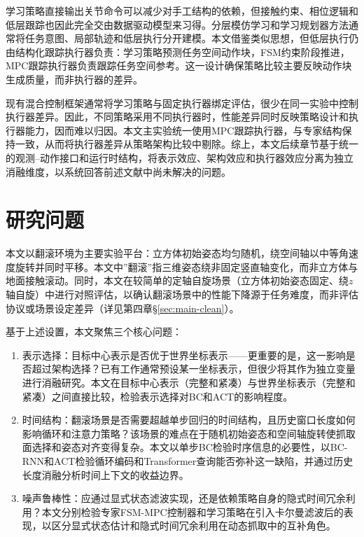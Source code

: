 学习策略直接输出关节命令可以减少对手工结构的依赖，但接触约束、相位逻辑和低层跟踪也因此完全交由数据驱动模型来习得。分层模仿学习和学习规划器方法通常将任务意图、局部轨迹和低层执行分开建模\citep{lynch2020learning,mandlekar2020iris,wang2023mimicplay}。本文借鉴类似思想，但低层执行仍由结构化跟踪执行器负责：学习策略预测任务空间动作块，FSM约束阶段推进，MPC跟踪执行器负责跟踪任务空间参考。这一设计确保策略比较主要反映动作块生成质量，而非执行器的差异。

现有混合控制框架通常将学习策略与固定执行器绑定评估，很少在同一实验中控制执行器差异。因此，不同策略采用不同执行器时，性能差异同时反映策略设计和执行器能力，因而难以归因。本文主实验统一使用MPC跟踪执行器，与专家结构保持一致，从而将执行器差异从策略架构比较中剔除。综上，本文后续章节基于统一的观测--动作接口和运行时结构，将表示效应、架构效应和执行器效应分离为独立消融维度，以系统回答前述文献中尚未解决的问题。

\section{研究问题}

本文以翻滚环境为主要实验平台：立方体初始姿态均匀随机，绕空间轴以中等角速度旋转并同时平移。本文中”翻滚”指三维姿态绕非固定竖直轴变化，而非立方体与地面接触滚动。同时，本文在较简单的定轴自旋场景（立方体初始姿态固定、绕$z$轴自旋）中进行对照评估，以确认翻滚场景中的性能下降源于任务难度，而非评估协议或场景设定差异（详见第四章\S\ref{sec:main-clean}）。

基于上述设置，本文聚焦三个核心问题：

\begin{enumerate}
    \item 表示选择：目标中心表示是否优于世界坐标表示——更重要的是，这一影响是否超过架构选择？已有工作通常预设某一坐标表示，但很少将其作为独立变量进行消融研究。本文在目标中心表示（完整和紧凑）与世界坐标表示（完整和紧凑）之间直接比较，检验表示选择对BC和ACT的影响程度。
    \item 时间结构：翻滚场景是否需要超越单步回归的时间结构，且历史窗口长度如何影响循环和注意力策略？该场景的难点在于随机初始姿态和空间轴旋转使抓取面选择和姿态对齐变得复杂。本文以单步BC检验时序信息的必要性，以BC-RNN和ACT检验循环编码和Transformer查询能否弥补这一缺陷，并通过历史长度消融分析时间上下文的收益边界。
    \item 噪声鲁棒性：应通过显式状态滤波实现，还是依赖策略自身的隐式时间冗余利用？本文分别检验专家FSM-MPC控制器和学习策略在引入卡尔曼滤波后的表现，以区分显式状态估计和隐式时间冗余利用在动态抓取中的互补角色。
\end{enumerate}


